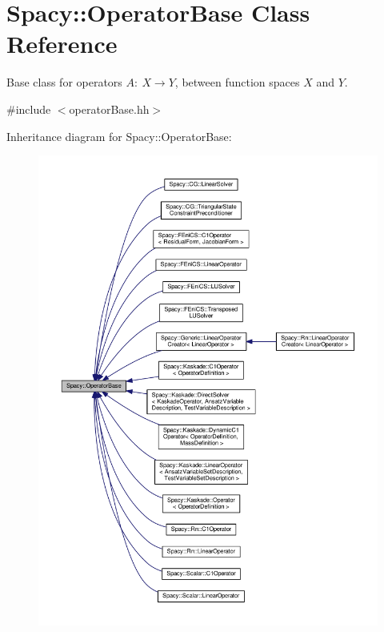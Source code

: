 \hypertarget{classSpacy_1_1OperatorBase}{}\section{Spacy\+:\+:Operator\+Base Class Reference}
\label{classSpacy_1_1OperatorBase}


Base class for operators $A:\ X\rightarrow Y$, between function spaces $X$ and $Y$.  




{\ttfamily \#include $<$operator\+Base.\+hh$>$}



Inheritance diagram for Spacy\+:\+:Operator\+Base\+:\nopagebreak
\begin{figure}[H]
\begin{center}
\leavevmode
\includegraphics[width=350pt]{classSpacy_1_1OperatorBase__inherit__graph}
\end{center}
\end{figure}
